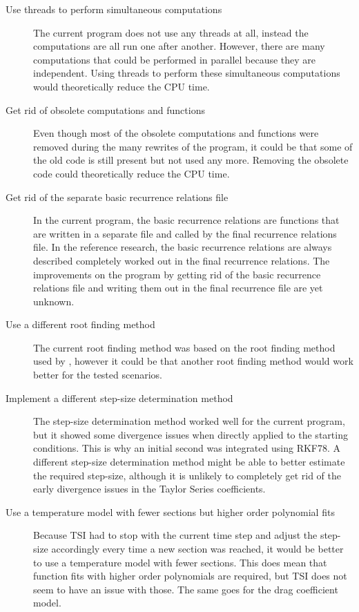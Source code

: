 \begin{description}
\item[Use threads to perform simultaneous computations]The current program does not use any threads at all, instead the computations are all run one after another. However, there are many computations that could be performed in parallel because they are independent. Using threads to perform these simultaneous computations would theoretically reduce the CPU time.
\item[Get rid of obsolete computations and functions] Even though most of the obsolete computations and functions were removed during the many rewrites of the program, it could be that some of the old code is still present but not used any more. Removing the obsolete code could theoretically reduce the CPU time.
\item[Get rid of the separate basic recurrence relations file] In the current program, the basic recurrence relations are functions that are written in a separate file and called by the final recurrence relations file. In the reference research, the basic recurrence relations are always described completely worked out in the final recurrence relations. The improvements on the program by getting rid of the basic recurrence relations file and writing them out in the final recurrence file are yet unknown.
\item[Use a different root finding method] The current root finding method was based on the root finding method used by \cite{bergsma2016application}, however it could be that another root finding method would work better for the tested scenarios. 
\item[Implement a different step-size determination method] The step-size determination method worked well for the current program, but it showed some divergence issues when directly applied to the starting conditions. This is why an initial second was integrated using \ac{RKF78}. A different step-size determination method might be able to better estimate the required step-size, although it is unlikely to completely get rid of the early divergence issues in the Taylor Series coefficients.
\item[Use a temperature model with fewer sections but higher order polynomial fits] Because \ac{TSI} had to stop with the current time step and adjust the step-size accordingly every time a new section was reached, it would be better to use a temperature model with fewer sections. This does mean that function fits with higher order polynomials are required, but \ac{TSI} does not seem to have an issue with those. The same goes for the drag coefficient model.

\end{description}
